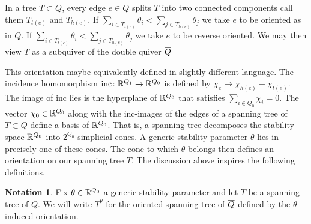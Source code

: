 \documentclass{amsart}
\theoremstyle{definition}
\newtheorem{defn}[thm]{Definition}
\newtheorem{rem}[thm]{Remark}
\newtheorem{notn}[thm]{Notation}
\begin{document}
In a tree $T \subset Q$, every edge $e \in Q$ splits $T$ into two connected components call them $T_{t(e)}$ and $T_{h(e)}$.
If $\sum_{i \in T_{t(e)}} \theta_i < \sum_{j \in T_{h(e)}}\theta_j$ we take $e$ to be oriented as in $Q$.
If $\sum_{i \in T_{t(e)}} \theta_i < \sum_{j \in T_{h(e)}}\theta_j$ we take $e$ to be reverse oriented.
We may then view $T$ as a subquiver of the double quiver ${\overline{Q}}$

This orientation maybe equivalently defined in slightly different language.
The incidence homomorphism $\textup{inc} \colon \mathbb{R}^{Q_1} \rightarrow \mathbb{R}^{Q_0}$ is defined by $\chi_e \mapsto \chi_{h(e)}-\chi_{t(e)}$.
The image of $\text{inc}$ lies is the hyperplane of $\mathbb{R}^{Q_0}$ that satisfies $\sum_{i\in Q_0} \chi_i =0$.
The vector $\chi_0 \in \mathbb{R}^{Q_0}$ along with the inc-images of the edges of a spanning tree of $T \subset Q$ define a basis of $\mathbb{R}^{Q_0}$.
That is, a spanning tree decomposes the stability space $\mathbb{R}^{Q_0}$ into $2^{Q_0}$ simplicial cones.
A generic stability parameter $\theta$ lies in precisely one of these cones.
The cone to which $\theta$ belongs then defines an orientation on our spanning tree $T$.
The discussion above inspires the following definitions.



\begin{notn}
Fix $\theta \in \mathbb{R}^{Q_0}$ a generic stability parameter and let $T$ be a spanning tree of $Q$. 
We will write $T^\theta$ for the oriented spanning tree of ${\overline{Q}}$ defined by the $\theta$ induced orientation.
\end{notn}
\end{document}
